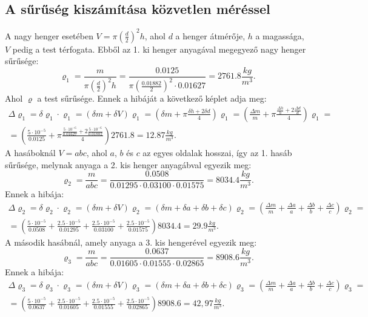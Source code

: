 \documentclass[10pt,pdftex]{report}
\begin{document}
\subsection*{A sűrűség kiszámítása közvetlen méréssel}
A nagy henger esetében $V=\pi\left(\frac{d}{2}\right)^2h$, ahol $d$ a henger átmérője, $h$ a magassága, $V$ pedig a test térfogata. Ebből az 1. ki henger anyagával megegyező nagy henger sűrűsége:
\begin{equation*}
    \varrho_1=\frac{m}{\pi\left(\frac{d}{2}\right)^2h}=\frac{0.0125}{\pi\left(\frac{0.01882}{2}\right)^2\cdot0.01627}=2761.8\frac{kg}{m^3}.
\end{equation*}
Ahol $\varrho$ a test sűrűsége.
Ennek a hibáját a következő képlet adja meg:
\begin{eqnarray*}
    \Delta \varrho_1=\delta\varrho_1\cdot\varrho_1=\left(\delta m +\delta V\right)\varrho_1=\left(\delta m + \pi\frac{\delta h + 2 \delta d}{4}\right)\varrho_1=\left(\frac{\Delta m}{m}+\pi\frac{\frac{\Delta h}{h} + 2\frac{\Delta d}{d}}{4}\right)\varrho_1=\\=\left(\frac{5\cdot10^{-5}}{0.0125} + \pi\frac{\frac{5\cdot10^{-6}}{0.01627} + 2\frac{5\cdot10^{-6}}{0.01882}}{4}\right)2761.8=12.87\frac{kg}{m^3}.
\end{eqnarray*}
A hasáboknál $V=abc$, ahol $a$, $b$ és $c$ az egyes oldalak hosszai, így az 1. hasáb sűrűsége, melynak anyaga a 2. kis henger anyagábval egyezik meg:
\begin{equation*}
    \varrho_2=\frac{m}{abc}=\frac{0.0508}{0.01295\cdot0.03100\cdot0.01575}=8034.4\frac{kg}{m^3}.
\end{equation*}
Ennek a hibája:
\begin{eqnarray*}
    \Delta \varrho_2=\delta \varrho_2\cdot\varrho_2=\left(\delta m + \delta V\right)\varrho_2=\left(\delta m+\delta a+\delta b+\delta c\right)\varrho_2=\left(\frac{\Delta m}{m}+\frac{\Delta a}{a}+\frac{\Delta b}{b}+\frac{\Delta c}{c}\right)\varrho_2=\\=\left(\frac{5\cdot10^{-5}}{0.0508}+\frac{2.5\cdot10^{-5}}{0.01295}+\frac{2.5\cdot10^{-5}}{0.03100}+\frac{2.5\cdot10^{-5}}{0.01575}\right)8034.4=29.9\frac{kg}{m^3}.
\end{eqnarray*}
A második hasábnál, amely anyaga a 3. kis hengerével egyezik meg:
\begin{equation*}
    \varrho_3=\frac{m}{abc}=\frac{0.0637}{0.01605\cdot0.01555\cdot0.02865}=8908.6\frac{kg}{m^3}.
\end{equation*}
Ennek a hibája:
\begin{eqnarray*}
    \Delta \varrho_3=\delta \varrho_3\cdot\varrho_3=\left(\delta m + \delta V\right)\varrho_3=\left(\delta m+\delta a+\delta b+\delta c\right)\varrho_3=\left(\frac{\Delta m}{m}+\frac{\Delta a}{a}+\frac{\Delta b}{b}+\frac{\Delta c}{c}\right)\varrho_3=\\=\left(\frac{5\cdot10^{-5}}{0.0637}+\frac{2.5\cdot10^{-5}}{0.01605}+\frac{2.5\cdot10^{-5}}{0.01555}+\frac{2.5\cdot10^{-5}}{0.02865}\right)8908.6=42,97\frac{kg}{m^3}.
\end{eqnarray*}
\end{document}
